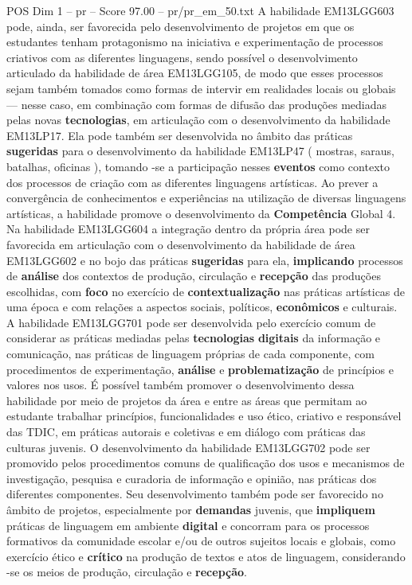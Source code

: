 \begin{textsample}{POS Dim 1 – pr – Score 97.00 – pr/pr\_em\_50.txt}
A habilidade EM13LGG603 pode, ainda, ser favorecida pelo desenvolvimento de projetos em que os estudantes tenham protagonismo na iniciativa e experimentação de processos criativos com as diferentes linguagens, sendo possível o desenvolvimento articulado da habilidade de área EM13LGG105, de modo que esses processos sejam também tomados como formas de intervir em realidades locais ou globais — nesse caso, em combinação com formas de difusão das produções mediadas pelas novas \textbf{tecnologias}, em articulação com o desenvolvimento da habilidade EM13LP17.
Ela pode também ser desenvolvida no âmbito das práticas \textbf{sugeridas} para o desenvolvimento da habilidade EM13LP47 ( mostras, saraus, batalhas, oficinas ), tomando -se a participação nesses \textbf{eventos} como contexto dos processos de criação com as diferentes linguagens artísticas.
Ao prever a convergência de conhecimentos e experiências na utilização de diversas linguagens artísticas, a habilidade promove o desenvolvimento da \textbf{Competência} Global 4.
Na habilidade EM13LGG604 a integração dentro da própria área pode ser favorecida em articulação com o desenvolvimento da habilidade de área EM13LGG602 e no bojo das práticas \textbf{sugeridas} para ela, \textbf{implicando} processos de \textbf{análise} dos contextos de produção, circulação e \textbf{recepção} das produções escolhidas, com \textbf{foco} no exercício de \textbf{contextualização} nas práticas artísticas de uma época e com relações a aspectos sociais, políticos, \textbf{econômicos} e culturais.
A habilidade EM13LGG701 pode ser desenvolvida pelo exercício comum de considerar as práticas mediadas pelas \textbf{tecnologias} \textbf{digitais} da informação e comunicação, nas práticas de linguagem próprias de cada componente, com procedimentos de experimentação, \textbf{análise} e \textbf{problematização} de princípios e valores nos usos.
É possível também promover o desenvolvimento dessa habilidade por meio de projetos da área e entre as áreas que permitam ao estudante trabalhar princípios, funcionalidades e uso ético, criativo e responsável das TDIC, em práticas autorais e coletivas e em diálogo com práticas das culturas juvenis.
O desenvolvimento da habilidade EM13LGG702 pode ser promovido pelos procedimentos comuns de qualificação dos usos e mecanismos de investigação, pesquisa e curadoria de informação e opinião, nas práticas dos diferentes componentes.
Seu desenvolvimento também pode ser favorecido no âmbito de projetos, especialmente por \textbf{demandas} juvenis, que \textbf{impliquem} práticas de linguagem em ambiente \textbf{digital} e concorram para os processos formativos da comunidade escolar e/ou de outros sujeitos locais e globais, como exercício ético e \textbf{crítico} na produção de textos e atos de linguagem, considerando -se os meios de produção, circulação e \textbf{recepção}.

\end{textsample}
